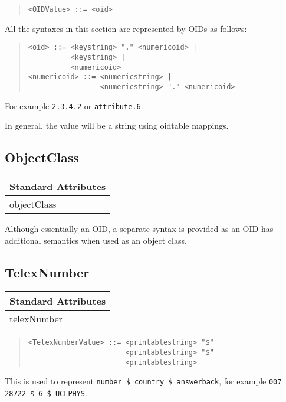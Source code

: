 \begin{quote}\begin{verbatim}
<OIDValue> ::= <oid>
\end{verbatim}\end{quote}

All the syntaxes in this section are represented by OIDs as follows:
\begin{quote}\begin{verbatim}
<oid> ::= <keystring> "." <numericoid> | 
          <keystring> | 
          <numericoid>
<numericoid> ::= <numericstring> | 
                 <numericstring> "." <numericoid>
\end{verbatim}\end{quote}
For example \verb+2.3.4.2+ or \verb+attribute.6+.

In general, the value will be a string using oidtable mappings.

\subsection{ObjectClass}
\begin{center}\small
\begin{tabular}{|l|}\hline
Standard Attributes \\ \hline
	objectClass\\
\hline
\end{tabular}
\end{center}
Although essentially an OID, a separate syntax is provided as an OID has
additional semantics when used as an object class.

\subsection{TelexNumber}
\begin{center}\small
\begin{tabular}{|l|}\hline
Standard Attributes \\ \hline
	telexNumber\\
\hline
\end{tabular}
\end{center}

\begin{quote}\begin{verbatim}
<TelexNumberValue> ::= <printablestring> "$" 
                       <printablestring> "$"
                       <printablestring>
\end{verbatim}\end{quote}
This is used to represent \verb+number $ country $ answerback+, for example
\verb+007 28722 $ G $ UCLPHYS+.

